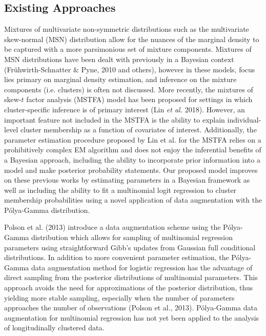 \documentclass[useAMS,referee]{biom}
\begin{document}
\subsection{Existing Approaches}

Mixtures of multivariate non-symmetric distributions such as the multivariate skew-normal (MSN) distribution allow for the nuances of the marginal density to be captured with a more parsimonious set of mixture components. Mixtures of MSN distributions have been dealt with previously in a Bayesian context (Fr\"{u}hwirth-Schnatter \& Pyne, 2010 and others), however in these models, focus lies primary on marginal density estimation, and inference on the mixture components (i.e. clusters) is often not discussed. More recently, the mixtures of skew-$t$ factor analysis (MSTFA) model has been proposed for settings in which cluster-specific inference is of primary interest (Lin \textit{et al.} 2018). However, an important feature not included in the MSTFA is the ability to explain individual-level cluster membership as a function of covariates of interest. Additionally, the parameter estimation procedure proposed by Lin et al. for the MSTFA relies on a prohibitively complex EM algorithm and does not enjoy the inferential benefits of a Bayesian approach, including the ability to incorporate prior information into a model and make posterior probability statements. Our proposed model improves on these previous works by estimating parameters in a Bayesian framework as well as including the ability to fit a multinomial logit regression to cluster membership probabilities using a novel application of data augmentation with the P\'olya-Gamma distribution.

Polson et al. (2013) introduce a data augmentation scheme using the P\'olya-Gamma distribution which allows for sampling of multinomial regression parameters using straightforward Gibb's updates from Gaussian full conditional distributions. In addition to more convenient parameter estimation, the P\'olya-Gamma data augmentation method for logistic regression has the advantage of direct sampling from the posterior distributions of multinomial parameters. This approach avoids the need for approximations of the posterior distribution, thus yielding more stable sampling, especially when the number of parameters approaches the number of observations (Polson et al., 2013). P\'olya-Gamma data augmentation for multinomial regression has not yet been applied to the analysis of longitudinally clustered data. 
\end{document}

